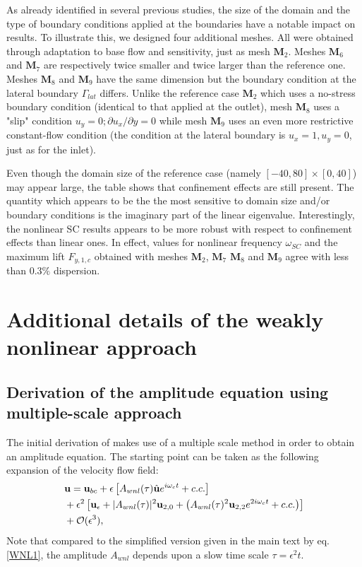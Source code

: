 \documentclass[twocolumn,10pt]{asme2ej}
\newcommand{\be}[1]{ \begin{equation} \label{#1}}
\newcommand{\ee}{\end{equation}}
\begin{document}
As already identified in several previous studies, the size of the domain and the type of boundary conditions applied at the boundaries have a notable impact on results.
To illustrate this, we designed four additional meshes.
All were obtained through adaptation to base flow and sensitivity, just as mesh $\mathbf{M}_2$.
Meshes $\mathbf{M}_6$ and $\mathbf{M}_7$ are respectively twice smaller and twice larger than the reference one. 
Meshes $\mathbf{M}_8$ and $\mathbf{M}_9$ have the same dimension but the boundary condition at the lateral boundary $\Gamma_{lat}$ differs. 
Unlike the reference case $\mathbf{M}_2$ which uses a no-stress boundary condition (identical to that applied at the outlet), mesh $\mathbf{M}_8$ uses a "slip" condition $u_y = 0 ; \partial u_x/\partial y = 0$ while mesh $\mathbf{M}_9$ uses an even more restrictive constant-flow condition (the condition at the lateral boundary is $u_x = 1, u_y = 0$, just as for the inlet).
 
Even though the domain size of the reference case (namely $[-40,80]\times[0,40]$) may appear large, the table shows that confinement effects are still present. The quantity which appears to be the the most sensitive to domain size and/or boundary conditions is the imaginary part of the linear eigenvalue.
Interestingly, the nonlinear SC results appears to be more robust with respect to confinement effects than linear ones. 
In effect, values for nonlinear frequency $\omega_{SC}$ and the maximum lift $F_{y,1,c}$ obtained with meshes  $\mathbf{M}_2$, $\mathbf{M}_7$ $\mathbf{M}_8$ and $\mathbf{M}_9$ agree with less than $0.3\%$ dispersion.





\section{Additional details of the weakly nonlinear approach}

\subsection{Derivation of the amplitude equation using multiple-scale approach}

The initial derivation of \cite{SippLebedev} makes use of a multiple scale method in order to obtain an amplitude equation.
The starting point can be taken as the following expansion of the velocity flow field:
\be{WNL2}
\begin{aligned}
&{\bf u} = {}  {\bf u}_{bc} + \epsilon \left[ A_{wnl}(\tau)  \hat{\bf u} e^{i \omega_c t} + c.c. \right]\\
&+ \epsilon^2 \left[ {\bf u}_\epsilon + |A_{wnl}(\tau) |^2  {\bf u}_{2,0} + \left(  A_{wnl}(\tau) ^2 {\bf u}_{2,2} e^{2 i \omega_c t} + c.c. \right) \right]\\
& + {\cal O}( \epsilon ^3),
\end{aligned}
\ee
Note that compared to the simplified version given in the main text by eq. \eqref{WNL1}, the amplitude $A_{wnl}$ depends upon a slow time scale 
$\tau = \epsilon^2 t$.
\end{document}
